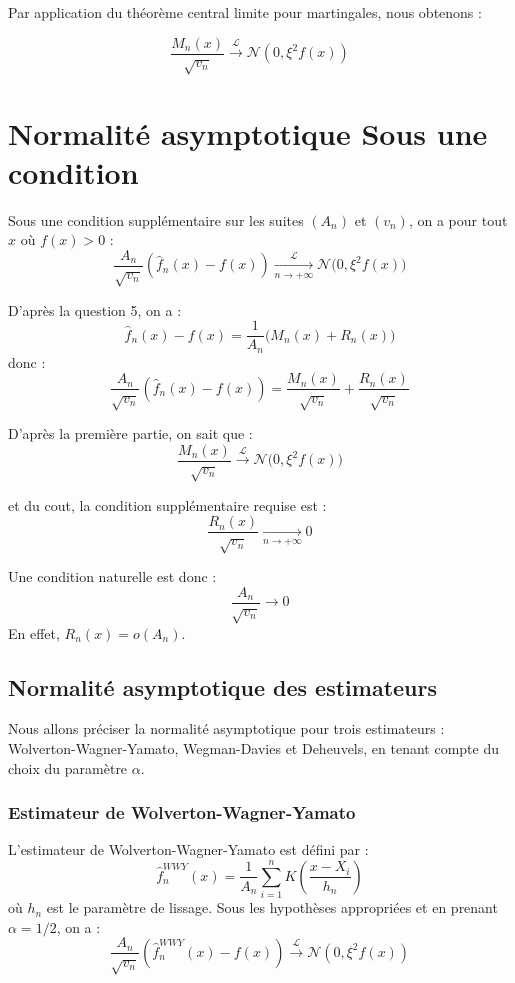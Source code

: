 \documentclass[12pt]{article}
\begin{document}
Par application du théorème central limite pour martingales, nous obtenons :

\[
\boxed{\frac{M_n(x)}{\sqrt{v_n}} \xrightarrow{\mathcal{L}} \mathcal{N}(0,\xi^2 f(x))}
\]

\section*{Normalité asymptotique Sous une condition }

Sous une condition supplémentaire sur les suites $(A_n)$ et $(v_n)$, on a pour tout $x$ où $f(x) > 0$ :
\[
\boxed{\frac{A_n}{\sqrt{v_n}} \left( \hat{f}_n(x) - f(x) \right) \xrightarrow[n\to+\infty]{\mathcal{L}} \mathcal{N}\big(0, \xi^2 f(x)\big)}
\]




D'après la question 5, on a :
\[
\hat{f}_n(x) - f(x) = \frac{1}{A_n} \big( M_n(x) + R_n(x) \big)
\]
donc :
\[
\frac{A_n}{\sqrt{v_n}} \left( \hat{f}_n(x) - f(x) \right) = \frac{M_n(x)}{\sqrt{v_n}} + \frac{R_n(x)}{\sqrt{v_n}}
\]


 D'après la première partie, on sait que :
    \[
    \frac{M_n(x)}{\sqrt{v_n}} \xrightarrow{\mathcal{L}} \mathcal{N}\big(0, \xi^2 f(x)\big)
    \]
    
et du cout, la condition supplémentaire requise est :
    \[
    \frac{R_n(x)}{\sqrt{v_n}} \xrightarrow[n\to+\infty]{} 0
    \]
    


Une condition naturelle est donc :
\[
\frac{A_n}{\sqrt{v_n}} \to 0
\]
En effet,  $R_n(x) = o(A_n)$.

\subsection*{Normalité asymptotique des estimateurs}

Nous allons préciser la normalité asymptotique pour trois estimateurs :  
Wolverton-Wagner-Yamato, Wegman-Davies et Deheuvels, en tenant compte du choix du paramètre \(\alpha\).

\subsubsection*{Estimateur de Wolverton-Wagner-Yamato}

L'estimateur de Wolverton-Wagner-Yamato est défini par :
\[
\hat{f}_n^{WWY}(x) = \frac{1}{A_n} \sum_{i=1}^{n} K\left(\frac{x - X_i}{h_n}\right)
\]
où \( h_n \) est le paramètre de lissage.  
Sous les hypothèses appropriées et en prenant \(\alpha = 1/2\), on a :
\[
\frac{A_n}{\sqrt{v_n}} \left( \hat{f}_n^{WWY}(x) - f(x) \right) \xrightarrow{\mathcal{L}} \mathcal{N}(0, \xi^2 f(x))
\]
\end{document}
